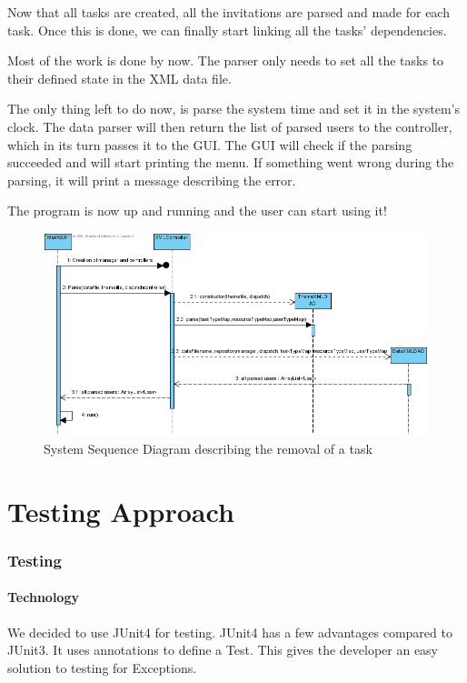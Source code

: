 			Now that all tasks are created, all the invitations are parsed and made for each task. Once this is done, we can finally start linking all the tasks' dependencies. 
			
			Most of the work is done by now. The parser only needs to set all the tasks to their defined state in the XML data file.
			
			The only thing left to do now, is parse the system time and set it in the system's clock. The data parser will then return the list of parsed users to the controller, which in its turn passes it to the GUI. The GUI will check if the parsing succeeded and will start printing the menu. If something went wrong during the parsing, it will print a message describing the error.
			
			The program is now up and running and the user can start using it!
			
			\begin{figure}[H]
				\begin{center}
					\includegraphics[scale=0.5]{images/System_Initiation.jpg}
				\end{center}
				\caption{System Sequence Diagram describing the removal of a task}
			\end{figure}
		
\part{Testing Approach}
	
	\section{Testing}
		\subsection{Technology}
		We decided to use JUnit4 for testing.
		JUnit4 has a few advantages compared to JUnit3. It uses annotations to define a Test. This gives the developer an easy solution to testing for Exceptions.
